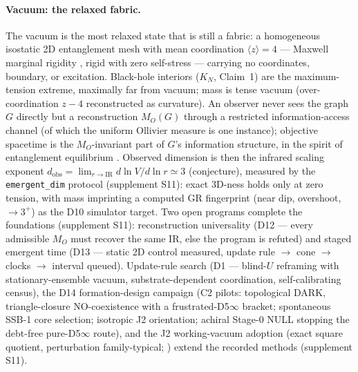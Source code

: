 \documentclass[11pt]{article}
\begin{document}
\paragraph{Vacuum: the relaxed fabric.}
The vacuum is the most relaxed state that is still a fabric: a homogeneous
isostatic 2D entanglement mesh with mean coordination $\langle z\rangle = 4$ ---
Maxwell marginal rigidity \cite{Maxwell1864}, rigid with zero self-stress ---
carrying no coordinates, boundary, or excitation. Black-hole interiors ($K_N$,
Claim~1) are the maximum-tension extreme, maximally far from vacuum; mass is
tense vacuum (over-coordination $z - 4$ reconstructed as curvature). An observer
never sees the graph $G$ directly but a reconstruction $M_O(G)$ through a
restricted information-access channel (of which the uniform Ollivier measure is
one instance); objective spacetime is the $M_O$-invariant part of $G$'s
information structure, in the spirit of entanglement equilibrium
\cite{Jacobson2016}. Observed dimension is then the infrared scaling exponent
$d_{\mathrm{obs}} = \lim_{r\to\mathrm{IR}} d\ln V/d\ln r \simeq 3$ (conjecture),
measured by the \texttt{emergent\_dim} protocol (supplement S11): exact 3D-ness
holds only at zero tension, with mass imprinting a computed GR fingerprint
(near dip, overshoot, $\to 3^+$) as the D10 simulator target. Two open
programs complete the foundations (supplement S11): reconstruction
universality (D12 --- every admissible $M_O$ must recover the same IR,
else the program is refuted) and staged emergent time (D13 --- static 2D
control measured, update rule $\to$ cone $\to$ clocks $\to$ interval queued).
Update-rule search (D1 --- blind-$U$ reframing with stationary-ensemble
vacuum, substrate-dependent coordination, self-calibrating census), the
D14 formation-design campaign (C2 pilots: topological DARK, triangle-closure
NO-coexistence with a frustrated-D5$\infty$ bracket; spontaneous SSB-1 core
selection; isotropic J2 orientation; achiral Stage-0 NULL stopping the
debt-free pure-D5$\infty$ route), and the J2 working-vacuum adoption (exact
square quotient, perturbation family-typical;
) extend the recorded methods (supplement S11).
\end{document}
